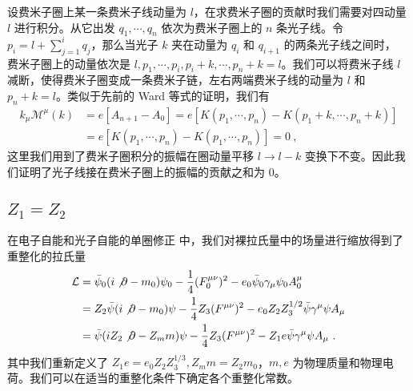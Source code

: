 设费米子圈上某一条费米子线动量为 $l$，在求费米子圈的贡献时我们需要对四动量 $l$ 进行积分。从它出发 $q_1,\cdots,q_n$ 依次为费米子圈上的 $n$ 条光子线。令 $p_i=l+\sum_{j=1}^i q_j$，那么当光子 $k$ 夹在动量为 $q_i$ 和 $q_{i+1}$ 的两条光子线之间时，
费米子圈上的动量依次是 $l,p_1,\cdots,p_i,
p_i+k,\cdots,p_n+k=l$。我们可以将费米子线 $l$ 减断，使得费米子圈变成一条费米子链，左右两端费米子线的动量为 $l$ 和 $p_n+k=l$。类似于先前的 Ward 等式的证明，我们有
\begin{equation}\label{eq_ward_4}
\begin{aligned}
k_\mu \mathcal{M}^\mu(k)&=e[A_{n+1}-A_0] =e[K(p_1,\cdots,p_n)-K(p_1+k,\cdots,p_n+k)]\\
&=e[K(p_1,\cdots,p_n)-K(p_1,\cdots,p_n)]=0~,
\end{aligned}
\end{equation}
这里我们用到了费米子圈积分的振幅在圈动量平移 $l\rightarrow l-k$ 变换下不变。因此我们证明了光子线接在费米子圈上的振幅的贡献之和为 $0$。

\subsection{$Z_1=Z_2$}
在电子自能和光子自能的单圈修正 中，我们对裸拉氏量中的场量进行缩放得到了重整化的拉氏量
\begin{equation}
\begin{aligned}
\mathcal{L} &= \bar{\psi}_0 (i\not\partial -m_0)\psi_0 -\frac{1}{4}(F_0^{\mu\nu})^2 - e_0\bar\psi_0 \gamma_\mu\psi_0 A_0^\mu
\\
&=Z_2\bar\psi (i\not\partial - m_0)\psi - \frac{1}{4}Z_3 (F^{\mu\nu})^2-e_0Z_2Z_3^{1/2} \bar\psi \gamma^\mu\psi A_\mu\\
&=\bar\psi (iZ_2\not\partial - Z_m m)\psi - \frac{1}{4}Z_3 (F^{\mu\nu})^2-Z_1 e \bar\psi \gamma^\mu\psi A_\mu~.
\end{aligned}
\end{equation}
其中我们重新定义了 $Z_1e=e_0 Z_2 Z_3^{1/3},Z_m m=Z_2 m_0$，$m,e$ 为物理质量和物理电荷。我们可以在适当的重整化条件下确定各个重整化常数。

